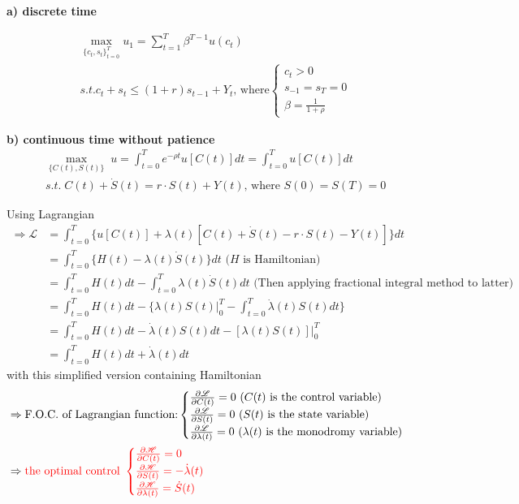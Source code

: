 \documentclass{article}
\begin{document}
\textbf{a) discrete time} 

\begin{equation}
\begin{split}
&\mathop{max}\limits_{\{c_{t},s_{t}\}_{t=0}^{T}} u_{1}=\sum\limits_{t=1}^{T}\beta^{T-1}u(c_{t})
\\&s.t. c_{t}+s_{t}\leqslant (1+r)s_{t-1}+Y_{t} \text{, where} \begin{cases}
c_{t}>0 \\
s_{-1}=s_{T}=0 \\
\beta=\frac{1}{1+\rho}
\end{cases}
\end{split}
\end{equation}





\textbf{b) continuous time without patience} 
\begin{equation}
\begin{split}
&\max_{\{C(t),S(t)\}} \; u=\int_{t=0}^{T}e^{-\rho t}u[C(t)]dt=\int_{t=0}^{T}u[C(t)]dt
\\& s.t. \; C(t)+\dot{S}(t)=r \cdot S(t)+Y(t) \text{, where } S(0)=S(T)=0
\end{split}
\end{equation}

Using Lagrangian
\begin{align}
\Rightarrow\mathscr{L}&=\int_{t=0}^{T} \{u[C(t)]+\lambda(t)[C(t)+\dot{S}(t)-r \cdot S(t)-Y(t)]\}dt
\\&=\int_{t=0}^{T} \{ H(t)-\lambda(t)\dot{S}(t)\}dt \text{ ($H$ is Hamiltonian)}
\\&=\int_{t=0}^{T} H(t)dt-\int_{t=0}^{T}\lambda(t)\dot{S}(t)dt \text{ (Then applying fractional integral method to latter)}
\\&=\int_{t=0}^{T} H(t)dt-\{ \lambda(t)S(t)|_{0}^{T} - \int_{t=0}^{T} \dot{\lambda}(t)S(t)dt \}
\\&=\int_{t=0}^{T} H(t)dt-\dot{\lambda}(t)S(t)dt-[\lambda(t)S(t)]|_{0}^{T}
\\&=\int_{t=0}^{T} H(t)dt+\dot{\lambda}(t)dt
\end{align}
with this simplified version containing Hamiltonian
\begin{align}
&\Rightarrow \text{F.O.C. of Lagrangian function:} \begin{cases}
\frac{\partial \mathscr{L}}{\partial C(t)}=0 \text{ (} C(t)\text{ is the control variable)}  \\
\frac{\partial \mathscr{L}}{\partial S(t)}=0 \text{ (} S(t)\text{ is the state variable)} \\
\frac{\partial \mathscr{L}}{\partial  \lambda(t)}=0 \text{ (} \lambda(t)\text{ is the monodromy variable)}\end{cases}
\\&\Rightarrow \color{red} \text{the optimal control }\begin{cases}
\frac{\partial \mathcal{H} }{\partial C(t)}=0 \\
\frac{\partial \mathcal{H}}{\partial S(t)}=-\dot\lambda(t) \\
\frac{\partial \mathcal{H}}{\partial \lambda(t)}=\dot S(t)\end{cases}
\end{align}
\end{document}
